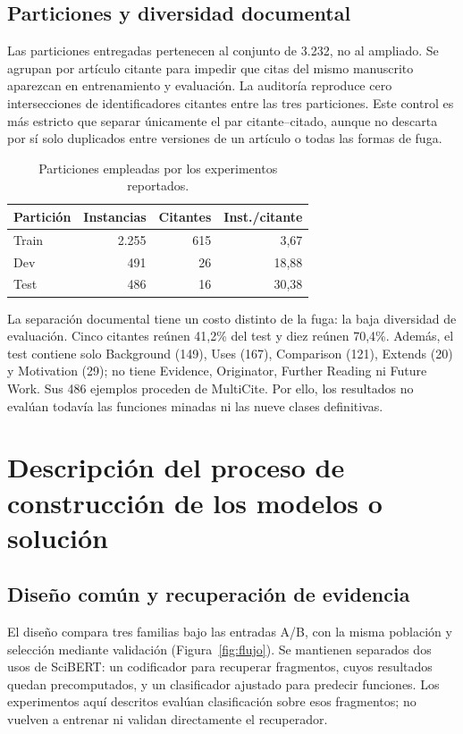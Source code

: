 \documentclass[10pt,a4paper,twocolumn]{article}
\begin{document}
\subsection{Particiones y diversidad documental}
Las particiones entregadas pertenecen al conjunto de 3.232, no al ampliado. Se agrupan por artículo citante para impedir que citas del mismo manuscrito aparezcan en entrenamiento y evaluación. La auditoría reproduce cero intersecciones de identificadores citantes entre las tres particiones. Este control es más estricto que separar únicamente el par citante--citado, aunque no descarta por sí solo duplicados entre versiones de un artículo o todas las formas de fuga.

\begin{table}[t]
\centering\small
\caption{Particiones empleadas por los experimentos reportados.}\label{tab:splits}
\begin{tabular}{lrrr}\toprule
Partición & Instancias & Citantes & Inst./citante\\\midrule
Train & 2.255 & 615 & 3,67\\
Dev & 491 & 26 & 18,88\\
Test & 486 & 16 & 30,38\\\bottomrule
\end{tabular}
\end{table}

La separación documental tiene un costo distinto de la fuga: la baja diversidad de evaluación. Cinco citantes reúnen 41,2\% del test y diez reúnen 70,4\%. Además, el test contiene solo Background (149), Uses (167), Comparison (121), Extends (20) y Motivation (29); no tiene Evidence, Originator, Further Reading ni Future Work. Sus 486 ejemplos proceden de MultiCite. Por ello, los resultados no evalúan todavía las funciones minadas ni las nueve clases definitivas.

\section{Descripción del proceso de construcción de los modelos o solución}
\subsection{Diseño común y recuperación de evidencia}
El diseño compara tres familias bajo las entradas A/B, con la misma población y selección mediante validación (Figura~\ref{fig:flujo}). Se mantienen separados dos usos de SciBERT: un codificador para recuperar fragmentos, cuyos resultados quedan precomputados, y un clasificador ajustado para predecir funciones. Los experimentos aquí descritos evalúan clasificación sobre esos fragmentos; no vuelven a entrenar ni validan directamente el recuperador.
\end{document}
